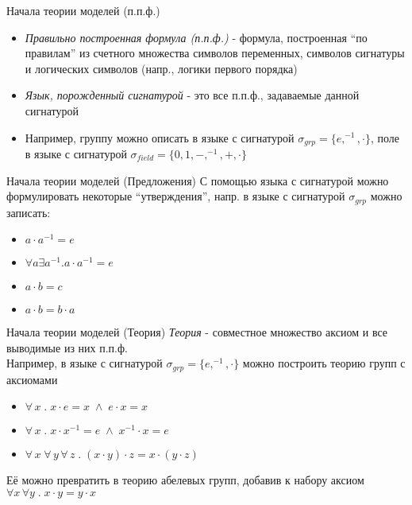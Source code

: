 \documentclass{beamer}
\begin{document}
\begin{frame}{Начала теории моделей (п.п.ф.)}
  \begin{itemize}
    \item \textit{Правильно построенная формула (п.п.ф.)} - формула, построенная ``по правилам'' из счетного множества символов переменных, символов сигнатуры и логических символов (напр., логики первого порядка)
    \item \textit{Язык, порожденный сигнатурой} - это все п.п.ф., задаваемые данной сигнатурой
    \item Например, группу можно описать в языке с сигнатурой $\sigma_{grp} = \{e, ^{-1}, \cdot\}$, поле в языке с сигнатурой $\sigma_{field} = \{0, 1, -, ^{-1}, +, \cdot\}$
  \end{itemize}
\end{frame}

\begin{frame}{Начала теории моделей (Предложения)}
С помощью языка с сигнатурой можно формулировать некоторые ``утверждения'', напр. в языке с сигнатурой $\sigma_{grp}$ можно записать:
  \begin{itemize}
    \item $a \cdot a^{-1} = e$
    \item $\forall a \exists a^{-1} . a \cdot a^{-1} = e$
    \item $a \cdot b = c$
    \item $a \cdot b = b \cdot a$
  \end{itemize}
\end{frame}

\begin{frame}{Начала теории моделей (Теория)}
\textit{Теория} - совместное множество аксиом и все выводимые из них п.п.ф.\\
\bigskip
Например, в языке с сигнатурой $\sigma_{grp} = \{e, ^{-1}, \cdot\}$ можно построить теорию групп с аксиомами\\
  \begin{itemize}
    \item $\forall \, x \; . \; x \cdot e = x \; \wedge \; e \cdot x = x$ 
    \item $\forall \, x \; . \;x \cdot x^{-1} = e \; \wedge \; x^{-1} \cdot x = e$ 
    \item $\forall \, x \; \forall \, y \, \forall \, z \; . \; (x \cdot y) \cdot z = x \cdot (y \cdot z)$
  \end{itemize}
Её можно превратить в теорию абелевых групп, добавив к набору аксиом $\forall x \, \forall y \; . \; x \cdot y = y \cdot x$
\end{frame}
\end{document}
